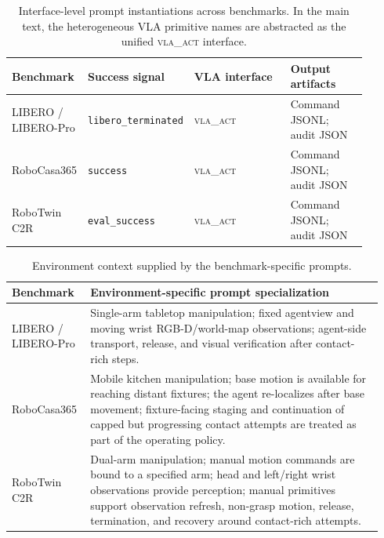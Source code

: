 \documentclass[11pt]{article}
\begin{document}
 \begin{table}[h]
  \centering
  \caption{Interface-level prompt instantiations across benchmarks. In the main text,
  the heterogeneous VLA primitive names are abstracted as the unified
  \textsc{vla\_act} interface.}
  \label{tab:app_prompt_instantiations}
  \footnotesize
  \setlength{\tabcolsep}{3pt}
  \begin{tabular}{@{}p{0.18\linewidth}p{0.22\linewidth}p{0.28\linewidth}p{0.22\linewidth}@{}}
  \toprule
  Benchmark & Success signal & VLA interface & Output artifacts \\
  \midrule
  LIBERO / LIBERO-Pro &
  \texttt{libero\_terminated} &
  \textsc{vla\_act} &
  Command JSONL; audit JSON \\
  \midrule
  RoboCasa365 &
  \texttt{success} &
  \textsc{vla\_act} &
  Command JSONL; audit JSON \\
  \midrule
  RoboTwin C2R &
  \texttt{eval\_success} &
  \textsc{vla\_act} &
  Command JSONL; audit JSON \\
  \bottomrule
  \end{tabular}
  \end{table}

  \begin{table}[h]
  \centering
  \caption{Environment context supplied by the benchmark-specific prompts.}
  \label{tab:app_prompt_env_content}
  \footnotesize
  \setlength{\tabcolsep}{3pt}
  \begin{tabular}{@{}p{0.18\linewidth}p{0.76\linewidth}@{}}
  \toprule
  Benchmark & Environment-specific prompt specialization \\
  \midrule
  LIBERO / LIBERO-Pro &
  Single-arm tabletop manipulation; fixed agentview and moving wrist RGB-D/world-map
  observations; agent-side transport,
  release, and visual verification after contact-rich steps. \\
  \midrule
  RoboCasa365 &
  Mobile kitchen manipulation; base motion is available for reaching distant fixtures;
  the agent re-localizes after base movement; fixture-facing staging and continuation of
  capped but progressing contact attempts are treated as part of the operating policy. \\
  \midrule
  RoboTwin C2R &
  Dual-arm manipulation; manual motion commands are bound to a specified arm; head and
  left/right wrist observations provide perception; manual primitives support
  observation refresh, non-grasp motion, release, termination, and recovery around
  contact-rich attempts. \\
  \bottomrule
  \end{tabular}
  \end{table}
\end{document}
